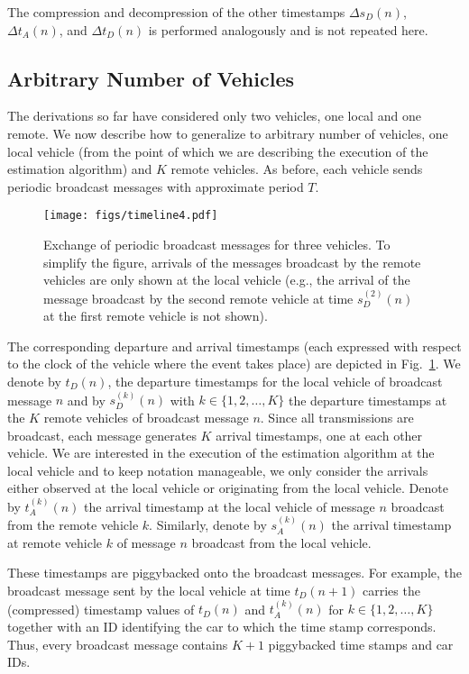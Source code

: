 \documentclass[12pt,journal,final,onecolumn]{IEEEtran}
\theoremstyle{definition}
\theoremstyle{myremark}
\newcommand{\dtd}{\Delta t_D}
\newcommand{\dta}{\Delta t_A}
\newcommand{\dsd}{\Delta s_D}
\begin{document}
The compression and decompression of the other timestamps $\dsd(n)$, $\dta(n)$,
and $\dtd(n)$ is performed analogously and is not repeated here.


\subsection{Arbitrary Number of Vehicles}
\label{sec:main_multiple}

The derivations so far have considered only two vehicles, one local and one remote.
We now describe how to generalize to arbitrary number of vehicles, one local
vehicle (from the point of which we are describing the execution of the
estimation algorithm) and $K$ remote vehicles. As before, each vehicle sends
periodic broadcast messages with approximate period $T$. 

\begin{figure}[htbp]
    \centering 
    \texttt{[image: figs/timeline4.pdf]} 

    \caption{Exchange of periodic broadcast messages for three vehicles. To simplify the figure,
    arrivals of the messages broadcast by the remote vehicles are only shown at
    the local vehicle (e.g., the arrival of the message broadcast by the second remote
    vehicle at time $s_D^{(2)}(n)$ at the first remote vehicle is not shown).}
    \label{fig:timeline4}
\end{figure}

The corresponding departure and arrival timestamps (each expressed with respect
to the clock of the vehicle where the event takes place) are depicted in
Fig.~\ref{fig:timeline4}. We denote by $t_D(n)$, the departure timestamps for
the local vehicle of broadcast message $n$ and by $s_D^{(k)}(n)$ with
$k\in\{1,2,\dots,K\}$ the departure timestamps at the $K$ remote vehicles of
broadcast message $n$. Since all transmissions are broadcast, each message
generates $K$ arrival timestamps, one at each other vehicle. We are interested
in the execution of the estimation algorithm at the local vehicle and to keep
notation manageable, we only consider the arrivals either observed at the local
vehicle or originating from the local vehicle. Denote by $t_A^{(k)}(n)$ the
arrival timestamp at the local vehicle of message $n$ broadcast from the remote
vehicle $k$. Similarly, denote by $s_A^{(k)}(n)$ the arrival timestamp at
remote vehicle $k$ of message $n$ broadcast from the local vehicle.

These timestamps are piggybacked onto the broadcast messages. For example, the
broadcast message sent by the local vehicle at time $t_D(n+1)$ carries the
(compressed) timestamp values of $t_D(n)$ and $t_A^{(k)}(n)$ for
$k\in\{1,2,\dots,K\}$ together with an ID identifying the car to which the time
stamp corresponds. Thus, every broadcast message contains $K+1$ piggybacked time
stamps and car IDs.
\end{document}
